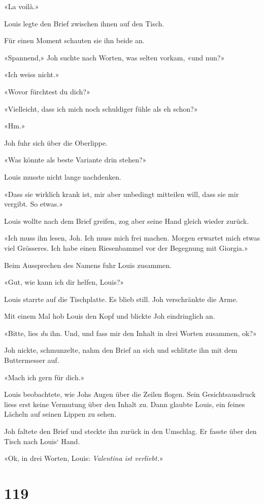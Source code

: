 «La voilà.»

Louis legte den Brief zwischen ihnen auf den Tisch.

Für einen Moment schauten sie ihn beide an.

«Spannend,» Joh suchte nach Worten, was selten vorkam, «und nun?»

«Ich weiss nicht.»

«Wovor fürchtest du dich?»

«Vielleicht, dass ich mich noch schuldiger fühle als eh schon?»

«Hm.»

Joh fuhr sich über die Oberlippe.

«Was könnte als beste Variante drin stehen?»

Louis musste nicht lange nachdenken.

«Dass sie wirklich krank ist, mir aber unbedingt mitteilen will, dass
sie mir vergibt. So etwas.»

Louis wollte nach dem Brief greifen, zog aber seine Hand gleich wieder
zurück.

«Ich muss ihn lesen, Joh. Ich muss mich frei machen. Morgen erwartet
mich etwas viel Grösseres. Ich habe einen Riesenbammel vor der Begegnung
mit Giorgia.»

Beim Aussprechen des Namens fuhr Louis zusammen.

«Gut, wie kann ich dir helfen, Louis?»

Louis starrte auf die Tischplatte. Es blieb still. Joh verschränkte die
Arme.

Mit einem Mal hob Louis den Kopf und blickte Joh eindringlich an.

«Bitte, lies \emph{du} ihn. Und, und fass mir den Inhalt in drei Worten
zusammen, ok?»

Joh nickte, schmunzelte, nahm den Brief an sich und schlitzte ihn mit
dem Buttermesser auf.

«Mach ich gern für dich.»

Louis beobachtete, wie Johs Augen über die Zeilen flogen. Sein
Gesichtsausdruck liess erst keine Vermutung über den Inhalt zu. Dann
glaubte Louis, ein feines Lächeln auf seinen Lippen zu sehen.

Joh faltete den Brief und steckte ihn zurück in den Umschlag. Er fasste
über den Tisch nach Louis` Hand.

«Ok, in drei Worten, Louis: \emph{Valentina ist verliebt.}»

\chapter{119}\label{section-119}

